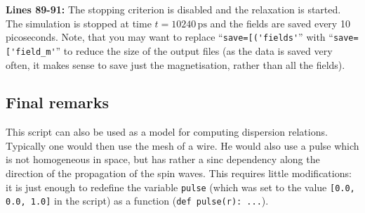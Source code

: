 \documentclass[11pt,oneside,openany]{article}
\begin{document}
\textbf{Lines 89-91:} The stopping criterion is disabled and the relaxation is
started. The simulation is stopped at time $t = 10240\,\mathrm{ps}$ and the
fields are saved every 10 picoseconds. Note, that you may want to replace
``\verb|save=[('fields'|'' with ``\verb|save=['field_m'|'' to reduce the size
of the output files (as the data is saved very often, it makes sense to save
just the magnetisation, rather than all the fields).

\subsection{Final remarks}
This script can also be used as a model for computing dispersion relations.
Typically one would then use the mesh of a wire.  He would also use a pulse
which is not homogeneous in space, but has rather a sinc dependency along the
direction of the propagation of the spin waves. This requires little
modifications: it is just enough to redefine the variable \verb|pulse| (which
was set to the value \verb|[0.0, 0.0, 1.0]| in the script) as a function
(\verb|def pulse(r): ...|).
\end{document}
